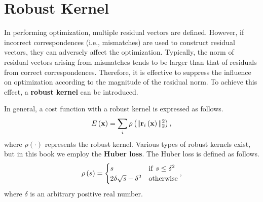 \section{Robust Kernel}

In performing optimization, multiple residual vectors are defined.
However, if incorrect correspondences (i.e., mismatches) are used to construct residual vectors, they can adversely affect the optimization.
Typically, the norm of residual vectors arising from mismatches tends to be larger than that of residuals from correct correspondences.
Therefore, it is effective to suppress the influence on optimization according to the magnitude of the residual norm.
To achieve this effect, a {\bf robust kernel} can be introduced.

In general, a cost function with a robust kernel is expressed as follows.
%
\begin{align}
  E \left( {\bf x} \right) = \sum_{i} \rho \left( \| {\bf r}_{i} \left( {\bf x} \right) \|_{2}^{2} \right),
  \label{eq:cost_function_robust_kernel}
\end{align}
%
where $\rho(\cdot)$ represents the robust kernel.
Various types of robust kernels exist, but in this book we employ the {\bf Huber loss}.
The Huber loss is defined as follows.
%
\begin{align}
  \rho \left( s \right)
  =
  \begin{cases}
    s                                & {\rm if} ~ s \leq \delta^{2} \\
    2 \delta \sqrt{ s } - \delta^{2} & {\rm otherwise}
  \end{cases},
  \label{eq:huber_loss}
\end{align}
%
where $\delta$ is an arbitrary positive real number.

